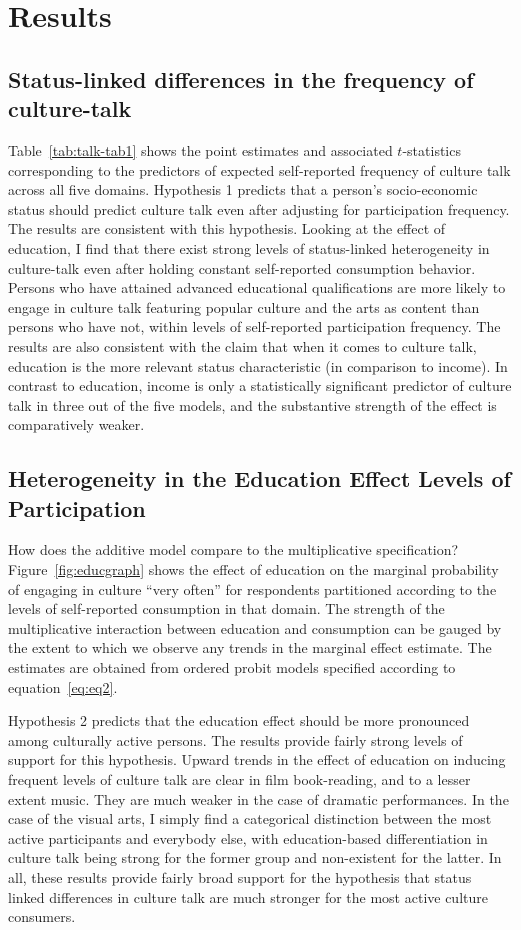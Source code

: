 \section{Results}
\subsection{Status-linked differences in the frequency of culture-talk}
Table~\ref{tab:talk-tab1} shows the point estimates and associated $t$-statistics corresponding to the predictors of expected self-reported frequency of culture talk across all five domains. Hypothesis 1 predicts that a person's socio-economic status should predict culture talk even after adjusting for participation frequency. The results are consistent with this hypothesis. Looking at the effect of education, I find that there exist strong levels of status-linked heterogeneity in culture-talk even after holding constant self-reported consumption behavior. Persons who have attained advanced educational qualifications are more likely to engage in culture talk featuring popular culture and the arts as content than persons who have not, within levels of self-reported participation frequency. The results are also consistent with the claim that when it comes to culture talk, education is the more relevant status characteristic (in comparison to income). In contrast to education, income is only a statistically significant predictor of culture talk in three out of the five models, and the substantive strength of the effect is comparatively weaker.

\subsection{Heterogeneity in the Education Effect Levels of Participation}
How does the additive model compare to the multiplicative specification?  Figure~\ref{fig:educgraph} shows the effect of education on the marginal probability of engaging in culture ``very often'' for respondents partitioned according to the levels of self-reported consumption in that domain. The strength of the multiplicative interaction between education and consumption can be gauged by the extent to which we observe any trends in the marginal effect estimate. The estimates are obtained from ordered probit models specified according to equation~\ref{eq:eq2}. 

Hypothesis 2 predicts that the education effect should be more pronounced among culturally active persons.  The results provide fairly strong levels of support for this hypothesis. Upward trends in the effect of education on inducing frequent levels of culture talk are clear in film book-reading, and to a lesser extent music.  They are much weaker in the case of dramatic performances. In the case of the visual arts, I simply find a categorical distinction between the most active participants and everybody else, with education-based differentiation in culture talk being strong for the former group and non-existent for the latter.  In all, these results provide fairly broad support for the hypothesis that status linked differences in culture talk are much stronger for the most active culture consumers.

